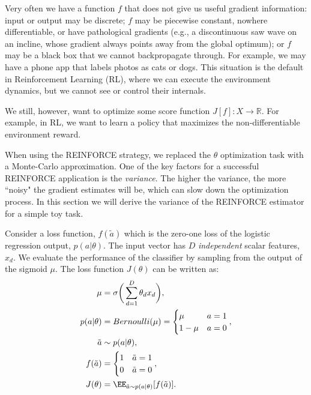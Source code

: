 Very often we have a function $f$ that does not give us useful gradient information: input or output may be discrete; $f$ may be piecewise constant, nowhere differentiable, or have pathological gradients (e.g., a discontinuous saw wave on an incline, whose gradient always points away from the global optimum); or $f$ may be a black box that we cannot backpropagate through. For example, we may have a phone app that labels photos as cats or dogs. This situation is the default in Reinforcement Learning (RL), where we can execute the environment dynamics, but we cannot see or control their internals.


We still, however, want to optimize some score function $J[f]: X \to \mathbb{R}$.  For example, in RL, we want to learn a policy that maximizes the non-differentiable environment reward.

\vspace{0.5em}


When using the REINFORCE strategy, we replaced the $\theta$ optimization task with a Monte-Carlo approximation. 
One of the key factors for a successful REINFORCE application is the \textit{variance}. The higher the variance, the more ``noisy" the gradient estimates will be, which can slow down the optimization process. In this section we will derive the variance of the REINFORCE estimator for a simple toy task. 

Consider a loss function, $f(\tilde{a})$ which is the zero-one loss of the logistic regression output, $p(a|\theta)$. The input vector has $D$ \textit{independent} scalar features, $x_d$. We evaluate the performance of the classifier by sampling from the output of the sigmoid $\mu$. The loss function $J(\theta)$ can be written as:
\vspace{-0.1in}
\begin{align}
\mu &= \sigma\bigg(\sum^{D}_{d=1}\theta_d x_d\bigg), \\
p(a | \theta) &= Bernoulli(\mu) = \begin{cases} \mu & a = 1 \\ 1-\mu & a = 0 \end{cases}, \\
\tilde{a} &\sim p(a | \theta), \\
f(\tilde{a}) &= \begin{cases} 1 & \tilde{a} = 1 \\ 0 & \tilde{a} = 0 \end{cases},\\
J(\theta) &= \EE_{\tilde{a} \sim p(a | \theta)} [f(\tilde{a})].
\end{align}


